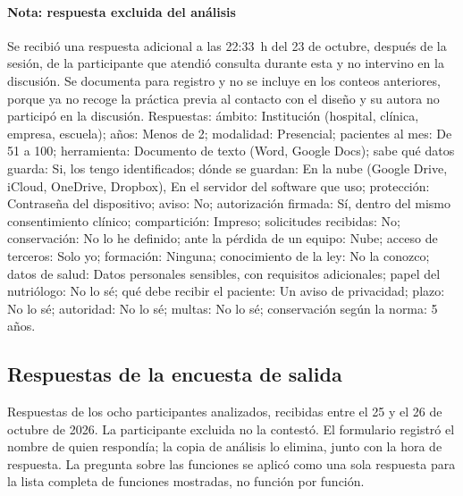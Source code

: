 \documentclass[12pt, a4paper]{article}
\begin{document}
\paragraph{Nota: respuesta excluida del análisis}
Se recibió una respuesta adicional a las 22:33~h del 23 de octubre, después de la sesión, de la participante que atendió consulta durante esta y no intervino en la discusión. Se documenta para registro y no se incluye en los conteos anteriores, porque ya no recoge la práctica previa al contacto con el diseño y su autora no participó en la discusión. Respuestas: ámbito: Institución (hospital, clínica, empresa, escuela); años: Menos de 2; modalidad: Presencial; pacientes al mes: De 51 a 100; herramienta: Documento de texto (Word, Google Docs); sabe qué datos guarda: Si, los tengo identificados; dónde se guardan: En la nube (Google Drive, iCloud, OneDrive, Dropbox), En el servidor del software que uso; protección: Contraseña del dispositivo; aviso: No; autorización firmada: Sí, dentro del mismo consentimiento clínico; compartición: Impreso; solicitudes recibidas: No; conservación: No lo he definido; ante la pérdida de un equipo: Nube; acceso de terceros: Solo yo; formación: Ninguna; conocimiento de la ley: No la conozco; datos de salud: Datos personales sensibles, con requisitos adicionales; papel del nutriólogo: No lo sé; qué debe recibir el paciente: Un aviso de privacidad; plazo: No lo sé; autoridad: No lo sé; multas: No lo sé; conservación según la norma: 5 años.

\subsection{Respuestas de la encuesta de salida}
\label{anexo:salida-resultados}

Respuestas de los ocho participantes analizados, recibidas entre el 25 y el 26 de octubre de 2026. La participante excluida no la contestó. El formulario registró el nombre de quien respondía; la copia de análisis lo elimina, junto con la hora de respuesta. La pregunta sobre las funciones se aplicó como una sola respuesta para la lista completa de funciones mostradas, no función por función.
\end{document}
